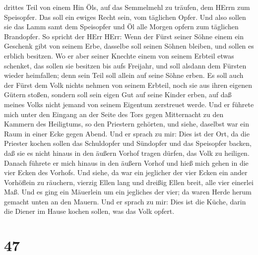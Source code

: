 drittes Teil von einem Hin Öls, auf das Semmelmehl zu träufen, dem HErrn
zum Speisopfer. Das soll ein ewiges Recht sein, vom täglichen Opfer.
 Und also sollen sie das Lamm samt dem Speisopfer und Öl
alle Morgen opfern zum täglichen Brandopfer.  So spricht
der HErr HErr: Wenn der Fürst seiner Söhne einem ein Geschenk gibt von
seinem Erbe, dasselbe soll seinen Söhnen bleiben, und sollen es erblich
besitzen.  Wo er aber seiner Knechte einem von seinem
Erbteil etwas schenket, das sollen sie besitzen bis aufs Freijahr, und
soll alsdann dem Fürsten wieder heimfallen; denn sein Teil soll allein
auf seine Söhne erben.  Es soll auch der Fürst dem Volk
nichts nehmen von seinem Erbteil, noch sie aus ihren eigenen Gütern
stoßen, sondern soll sein eigen Gut auf seine Kinder erben, auf daß
meines Volks nicht jemand von seinem Eigentum zerstreuet werde.
 Und er führete mich unter den Eingang an der Seite des
Tors gegen Mitternacht zu den Kammern des Heiligtums, so den Priestern
gehörten, und siehe, daselbst war ein Raum in einer Ecke gegen Abend.
 Und er sprach zu mir: Dies ist der Ort, da die Priester
kochen sollen das Schuldopfer und Sündopfer und das Speisopfer backen,
daß sie es nicht hinaus in den äußern Vorhof tragen dürfen, das Volk zu
heiligen.  Danach führete er mich hinaus in den äußern
Vorhof und hieß mich gehen in die vier Ecken des Vorhofs. 
Und siehe, da war ein jeglicher der vier Ecken ein ander Vorhöflein zu
räuchern, vierzig Ellen lang und dreißig Ellen breit, alle vier einerlei
Maß.  Und es ging ein Mäuerlein um ein jegliches der vier;
da waren Herde herum gemacht unten an den Mauern.  Und er
sprach zu mir: Dies ist die Küche, darin die Diener im Hause kochen
sollen, was das Volk opfert.

\hypertarget{section-46}{%
\section{47}\label{section-46}}

